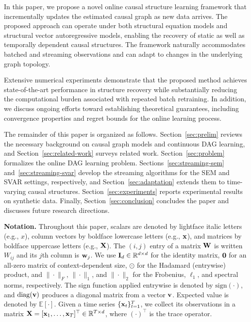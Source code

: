 \documentclass[journal,twoside]{IEEEtran}
\begin{document}
In this paper, we propose a novel online causal structure learning framework that incrementally updates the estimated causal graph as new data arrives. The proposed approach can operate under both structural equation models and structural vector autoregressive models, enabling the recovery of static as well as temporally dependent causal structures. The framework naturally accommodates batched and streaming observations and can adapt to changes in the underlying graph topology.

Extensive numerical experiments demonstrate that the proposed method achieves state-of-the-art performance in structure recovery while substantially reducing the computational burden associated with repeated batch retraining. In addition, we discuss ongoing efforts toward establishing theoretical guarantees, including convergence properties and regret bounds for the online learning process.

The remainder of this paper is organized as follows. Section~\ref{sec:prelim} reviews the necessary background on causal graph models and continuous DAG learning, and Section~\ref{sec:related-work} surveys related work. Section~\ref{sec:problem} formalizes the online DAG learning problem. Sections~\ref{sec:streaming-sem} and~\ref{sec:streaming-svar} develop the streaming algorithms for the SEM and SVAR settings, respectively, and Section~\ref{sec:adaptation} extends them to time-varying causal structures. Section~\ref{sec:experiments} reports experimental results on synthetic data. Finally, Section~\ref{sec:conclusion} concludes the paper and discusses future research directions.\vspace{2pt}

\noindent \textbf{Notation.} Throughout this paper, scalars are denoted by lightface italic letters
(e.g., $x$), column vectors by boldface lowercase letters (e.g., ${\mathbf x}$),
and matrices by boldface uppercase letters (e.g., ${\mathbf X}$).
The $(i,j)$ entry of a matrix ${\mathbf W}$ is written $W_{ij}$ and its $j$th
column is ${\mathbf w}_j$. We use ${\mathbf I}_d \in \mathbb{R}^{d \times d}$
for the identity matrix, ${\mathbf 0}$ for an all-zero matrix of context-dependent
size, $\odot$ for the Hadamard (entrywise) product, and $\|\cdot\|_F$,
$\|\cdot\|_1$, and $\|\cdot\|_2$ for the Frobenius, $\ell_1$, and spectral
norms, respectively. The sign function applied entrywise is denoted by
$\mathrm{sign}(\cdot)$, and $\mathrm{diag}({\mathbf v})$ produces a diagonal
matrix from a vector ${\mathbf v}$. Expected value is denoted by
$\mathbb{E}[\cdot]$. Given a time series $\{{\mathbf x}_t\}_{t=1}^{T}$, we collect
its observations in a matrix ${\mathbf X} = [{\mathbf x}_1, \ldots, {\mathbf x}_T]^\top
\in \mathbb{R}^{T \times d}$, where $(\cdot)^\top$ is the trace operator.
\end{document}
